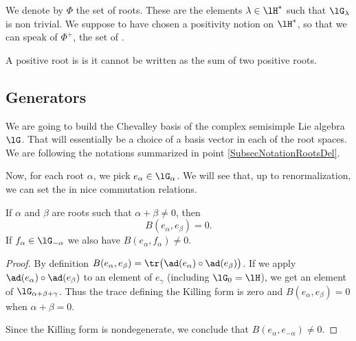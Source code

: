 We denote by \( \Phi\) the set of roots. These are the elements \( \lambda\in\lH^*\) such that \( \lG_{\lambda}\) is non trivial. We suppose to have chosen a positivity notion on \( \lH^*\), so that we can speak of \( \Phi^+\), the set of .

A positive root is  is it cannot be written as the sum of two positive roots.

                    \subsection{Generators}

We are going to build the Chevalley basis of the complex semisimple Lie algebra \( \lG\). That will essentially be a choice of a basis vector in each of the root spaces. We are following the notations summarized in point \ref{SubsecNotationRootsDel}.


Now, for each root $\alpha$, we pick $e_{\alpha}\in\lG_{\alpha}$. We will see that, up to renormalization, we can set the in nice commutation relations.

\begin{lemma}       \label{LemBalpahbetaef}
    If \( \alpha\) and \( \beta\) are roots such that \( \alpha+\beta\neq 0\), then 
    \begin{equation}
        B(e_{\alpha},e_{\beta})=0.
    \end{equation}
    If \( f_{\alpha}\in\lG_{-\alpha}\) we also have \( B(e_{\alpha},f_{\alpha})\neq 0\).
\end{lemma}

\begin{proof}
    By definition \( B(e_{\alpha},e_{\beta})=\tr\big( \ad(e_{\alpha})\circ\ad(e_{\beta}) \big)\). If we apply \( \ad(e_{\alpha})\circ\ad(e_{\beta})\) to an element of \( e_{\gamma}\) (including \( \lG_0=\lH\)), we get an element of \( \lG_{\alpha+\beta+\gamma}\). Thus the trace defining the Killing form is zero and \( B(e_{\alpha},e_{\beta})=0\) when \( \alpha+\beta=0\). 

    Since the Killing form is nondegenerate, we conclude that \( B(e_{\alpha},e_{-\alpha})\neq 0 \).
\end{proof}

